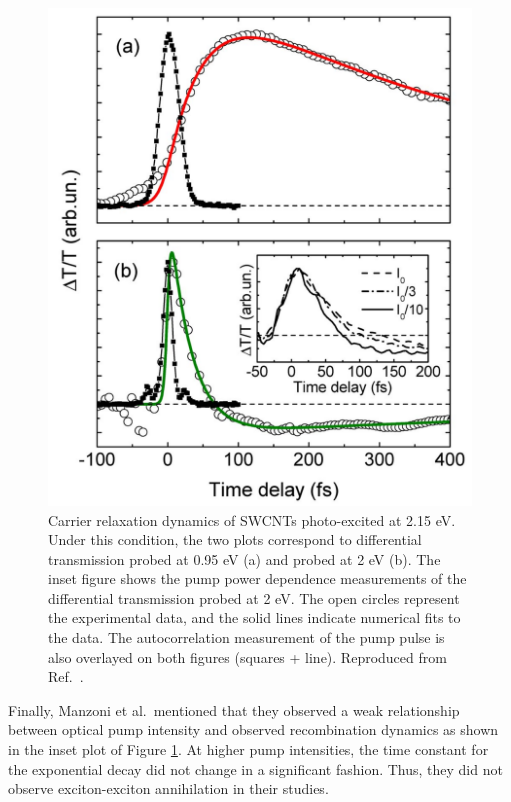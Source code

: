 \begin{figure}[H]
	\centering
	\includegraphics[scale=0.3]{images/chapter_prior_works/e22_pump_probe_manzoni}
	\caption{Carrier relaxation dynamics of SWCNTs photo-excited at 2.15 eV. Under this condition, the two plots correspond to differential transmission probed at 0.95 eV (a) and probed at 2 eV (b). The inset figure shows the pump power dependence measurements of the differential transmission probed at 2 eV. The open circles represent the experimental data, and the solid lines indicate numerical fits to the data. The autocorrelation measurement of the pump pulse is also overlayed on both figures (squares + line). Reproduced from Ref.\ \cite{manzoni2005intersubband}.}
	\label{fig:e22_pump_manzoni}
\end{figure}

Finally, Manzoni et al.\ mentioned that they observed a weak relationship between optical pump intensity and observed recombination dynamics as shown in the inset plot of Figure \ref{fig:e22_pump_manzoni}. At higher pump intensities, the time constant for the exponential decay did not change in a significant fashion. Thus, they did not observe exciton-exciton annihilation in their studies.





